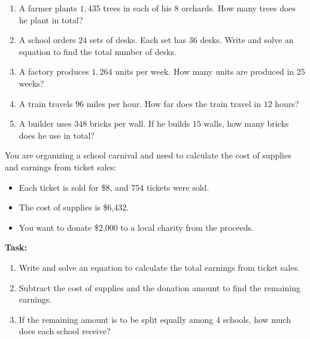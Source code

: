 \documentclass[12pt]{article}
\begin{document}
\begin{tcolorbox}[colframe=black!60, colback=white, 
coltitle=black, colbacktitle=black!15, fonttitle=\bfseries\Large, 
title=Problems, halign title=center, left=10pt, right=10pt, top=10pt, bottom=90pt]
\begin{enumerate}[start=9, itemsep=8em]
    \item A farmer plants \( 1,435 \) trees in each of his \( 8 \) orchards. How many trees does he plant in total?
    \item A school orders \( 24 \) sets of desks. Each set has \( 36 \) desks. Write and solve an equation to find the total number of desks.
    \item A factory produces \( 1,264 \) units per week. How many units are produced in \( 25 \) weeks?
    \item A train travels \( 96 \) miles per hour. How far does the train travel in \( 12 \) hours?
    \item A builder uses \( 348 \) bricks per wall. If he builds \( 15 \) walls, how many bricks does he use in total?
\end{enumerate}
\end{tcolorbox}

\vspace{1em}

\begin{tcolorbox}[colframe=black!60, colback=white, 
coltitle=black, colbacktitle=black!15, fonttitle=\bfseries\Large, 
title=Performance Task: Planning a School Carnival, halign title=center, left=10pt, right=10pt, top=10pt, bottom=50pt]
You are organizing a school carnival and need to calculate the cost of supplies and earnings from ticket sales:
\begin{itemize}
    \item Each ticket is sold for \$8, and \( 754 \) tickets were sold.
    \item The cost of supplies is \$6,432.
    \item You want to donate \$2,000 to a local charity from the proceeds.
\end{itemize}
\textbf{Task:}
\begin{enumerate}[itemsep=3em]
    \item Write and solve an equation to calculate the total earnings from ticket sales. \vspace{1cm}

    \item Subtract the cost of supplies and the donation amount to find the remaining earnings. \vspace{1cm}

    \item If the remaining amount is to be split equally among \( 4 \) schools, how much does each school receive?
    \vspace{1cm}
\end{enumerate}
\end{tcolorbox}
\end{document}
